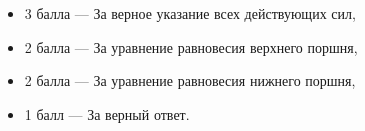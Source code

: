 	\begin{itemize} 
	\item{3 балла} --- За верное указание всех действующих сил,
	\item{2 балла} --- За уравнение равновесия верхнего поршня,
	\item{2 балла} --- За уравнение равновесия нижнего поршня,
	\item{1 балл} --- За верный ответ.
\end{itemize}